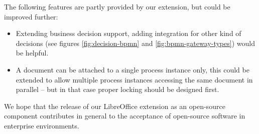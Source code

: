 The following features are partly provided by our extension, but could be
improved further:

\begin{itemize}
\item Extending business decision support, adding integration for other kind of
decisions (see figures \ref{fig:decision-bpmn} and
\ref{fig:bpmn-gateway-types}) would be helpful.
\item A document can be attached to a single process instance only, this could
be extended to allow multiple process instances accessing the same document in
parallel -- but in that case proper locking should be designed first.
\end{itemize}

We hope that the release of our LibreOffice extension as an open-source
component contributes in general to the acceptance of open-source software in
enterprise environments.
